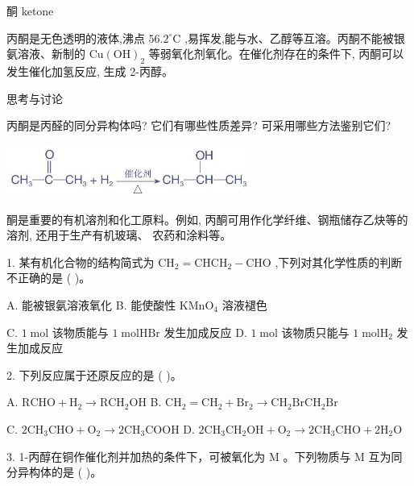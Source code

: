 \documentclass[10pt]{article}
\begin{document}
酮 ketone

丙酮是无色透明的液体,沸点 \({56.2}^{ \circ }\mathrm{C}\) ,易挥发,能与水、乙醇等互溶。丙酮不能被银氨溶液、新制的 \(\mathrm{{Cu}}{\left( \mathrm{{OH}}\right) }_{2}\) 等弱氧化剂氧化。在催化剂存在的条件下, 丙酮可以发生催化加氢反应, 生成 2-丙醇。

\begin{mdframed}

思考与讨论

丙酮是丙醛的同分异构体吗? 它们有哪些性质差异? 可采用哪些方法鉴别它们?

\end{mdframed}

\begin{center}
\includegraphics[max width=0.6\textwidth]{images/0190efc5-b58a-7c43-bfb0-e0a030df9cfd_76_288226.jpg}
\end{center}

酮是重要的有机溶剂和化工原料。例如, 丙酮可用作化学纤维、钢瓶储存乙炔等的溶剂, 还用于生产有机玻璃、 农药和涂料等。

1. 某有机化合物的结构简式为 \({\mathrm{{CH}}}_{2} = {\mathrm{{CHCH}}}_{2} - \mathrm{{CHO}}\) ,下列对其化学性质的判断不正确的是 ( )。

A. 能被银氨溶液氧化 B. 能使酸性 \({\mathrm{{KMnO}}}_{4}\) 溶液褪色

C. \(1\mathrm{\;{mol}}\) 该物质能与 \(1\mathrm{\;{mol}}\mathrm{{HBr}}\) 发生加成反应 D. \(1\mathrm{\;{mol}}\) 该物质只能与 \(1\mathrm{\;{mol}}{\mathrm{H}}_{2}\) 发生加成反应

2. 下列反应属于还原反应的是 ( )。

A. \(\mathrm{{RCHO}} + {\mathrm{H}}_{2} \rightarrow {\mathrm{{RCH}}}_{2}\mathrm{{OH}}\) B. \({\mathrm{{CH}}}_{2} = {\mathrm{{CH}}}_{2} + {\mathrm{{Br}}}_{2} \rightarrow {\mathrm{{CH}}}_{2}{\mathrm{{BrCH}}}_{2}\mathrm{{Br}}\)

C. \(2{\mathrm{{CH}}}_{3}\mathrm{{CHO}} + {\mathrm{O}}_{2} \rightarrow 2{\mathrm{{CH}}}_{3}\mathrm{{COOH}}\) D. \(2{\mathrm{{CH}}}_{3}{\mathrm{{CH}}}_{2}\mathrm{{OH}} + {\mathrm{O}}_{2} \rightarrow 2{\mathrm{{CH}}}_{3}\mathrm{{CHO}} + 2{\mathrm{H}}_{2}\mathrm{O}\)

3. 1-丙醇在铜作催化剂并加热的条件下，可被氧化为 \(\mathrm{M}\) 。下列物质与 \(\mathrm{M}\) 互为同分异构体的是 ( )。
\end{document}
